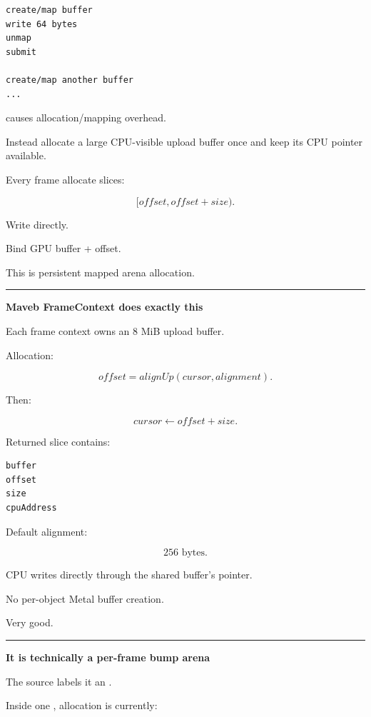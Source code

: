 \protect{}\label{p10-map-everything}%
\begin{verbatim}
create/map buffer
write 64 bytes
unmap
submit

create/map another buffer
...
\end{verbatim}

causes allocation/mapping overhead.

Instead allocate a large CPU-visible upload buffer once and keep its CPU pointer available.

Every frame allocate slices:

\[
[offset,offset+size).
\]

Write directly.

Bind GPU buffer + offset.

This is persistent mapped arena allocation.

\begin{center}\rule{0.5\linewidth}{0.5pt}\end{center}

\textbf{Maveb FrameContext does exactly this}

Each frame context owns an 8 MiB  upload buffer.

Allocation:

\[
offset=
alignUp(cursor,alignment).
\]

Then:

\[
cursor\leftarrow offset+size.
\]

Returned slice contains:

\protect{}\label{p10-slice}%
\begin{verbatim}
buffer
offset
size
cpuAddress
\end{verbatim}

Default alignment:

\[
256\text{ bytes}.
\]

CPU writes directly through the shared buffer's  pointer.

No per-object Metal buffer creation.

Very good.

\begin{center}\rule{0.5\linewidth}{0.5pt}\end{center}

\textbf{It is technically a per-frame bump arena}

The source labels it an .

Inside one , allocation is currently:

